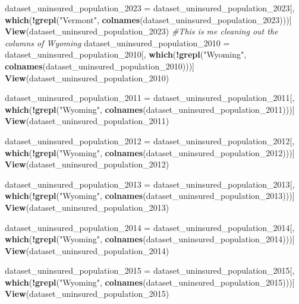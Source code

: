 \documentclass[
]{article}
\newenvironment{Shaded}{\begin{snugshade}}{\end{snugshade}}
\newcommand{\CommentTok}[1]{\textcolor[rgb]{0.56,0.35,0.01}{\textit{#1}}}
\newcommand{\FunctionTok}[1]{\textcolor[rgb]{0.13,0.29,0.53}{\textbf{#1}}}
\newcommand{\NormalTok}[1]{#1}
\newcommand{\OtherTok}[1]{\textcolor[rgb]{0.56,0.35,0.01}{#1}}
\newcommand{\SpecialCharTok}[1]{\textcolor[rgb]{0.81,0.36,0.00}{\textbf{#1}}}
\newcommand{\StringTok}[1]{\textcolor[rgb]{0.31,0.60,0.02}{#1}}
\begin{document}
\begin{Shaded}
\begin{Highlighting}[]
\NormalTok{dataset\_uninsured\_population\_2023 }\OtherTok{=}\NormalTok{ dataset\_uninsured\_population\_2023[, }\FunctionTok{which}\NormalTok{(}\SpecialCharTok{!}\FunctionTok{grepl}\NormalTok{(}\StringTok{"Vermont"}\NormalTok{, }\FunctionTok{colnames}\NormalTok{(dataset\_uninsured\_population\_2023)))]}
\FunctionTok{View}\NormalTok{(dataset\_uninsured\_population\_2023)}
\CommentTok{\#This is me cleaning out the columns of Wyoming}
\NormalTok{dataset\_uninsured\_population\_2010 }\OtherTok{=}\NormalTok{ dataset\_uninsured\_population\_2010[, }\FunctionTok{which}\NormalTok{(}\SpecialCharTok{!}\FunctionTok{grepl}\NormalTok{(}\StringTok{"Wyoming"}\NormalTok{, }\FunctionTok{colnames}\NormalTok{(dataset\_uninsured\_population\_2010)))]}
\FunctionTok{View}\NormalTok{(dataset\_uninsured\_population\_2010)}

\NormalTok{dataset\_uninsured\_population\_2011 }\OtherTok{=}\NormalTok{ dataset\_uninsured\_population\_2011[, }\FunctionTok{which}\NormalTok{(}\SpecialCharTok{!}\FunctionTok{grepl}\NormalTok{(}\StringTok{"Wyoming"}\NormalTok{, }\FunctionTok{colnames}\NormalTok{(dataset\_uninsured\_population\_2011)))]}
\FunctionTok{View}\NormalTok{(dataset\_uninsured\_population\_2011)}

\NormalTok{dataset\_uninsured\_population\_2012 }\OtherTok{=}\NormalTok{ dataset\_uninsured\_population\_2012[, }\FunctionTok{which}\NormalTok{(}\SpecialCharTok{!}\FunctionTok{grepl}\NormalTok{(}\StringTok{"Wyoming"}\NormalTok{, }\FunctionTok{colnames}\NormalTok{(dataset\_uninsured\_population\_2012)))]}
\FunctionTok{View}\NormalTok{(dataset\_uninsured\_population\_2012)}

\NormalTok{dataset\_uninsured\_population\_2013 }\OtherTok{=}\NormalTok{ dataset\_uninsured\_population\_2013[, }\FunctionTok{which}\NormalTok{(}\SpecialCharTok{!}\FunctionTok{grepl}\NormalTok{(}\StringTok{"Wyoming"}\NormalTok{, }\FunctionTok{colnames}\NormalTok{(dataset\_uninsured\_population\_2013)))]}
\FunctionTok{View}\NormalTok{(dataset\_uninsured\_population\_2013)}

\NormalTok{dataset\_uninsured\_population\_2014 }\OtherTok{=}\NormalTok{ dataset\_uninsured\_population\_2014[, }\FunctionTok{which}\NormalTok{(}\SpecialCharTok{!}\FunctionTok{grepl}\NormalTok{(}\StringTok{"Wyoming"}\NormalTok{, }\FunctionTok{colnames}\NormalTok{(dataset\_uninsured\_population\_2014)))]}
\FunctionTok{View}\NormalTok{(dataset\_uninsured\_population\_2014)}

\NormalTok{dataset\_uninsured\_population\_2015 }\OtherTok{=}\NormalTok{ dataset\_uninsured\_population\_2015[, }\FunctionTok{which}\NormalTok{(}\SpecialCharTok{!}\FunctionTok{grepl}\NormalTok{(}\StringTok{"Wyoming"}\NormalTok{, }\FunctionTok{colnames}\NormalTok{(dataset\_uninsured\_population\_2015)))]}
\FunctionTok{View}\NormalTok{(dataset\_uninsured\_population\_2015)}


\end{Highlighting}
\end{Shaded}
\end{document}
